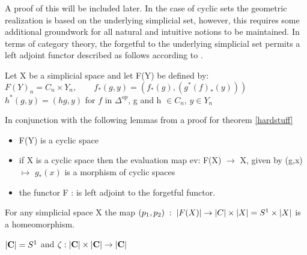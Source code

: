 \documentclass[../../main.tex]{subfiles}
\begin{document}
    A proof of this will be included later. In the case of cyclic sets the geometric realization is based on the underlying simplicial set, however, this requires some additional groundwork for all natural and intuitive notions to be maintained. In terms of category theory, the forgetful to the underlying simplicial set permits a left adjoint functor described as follows according to \cite{loday-cyclic}. 

    \begin{definition}
        Let X be a simplicial space and let F(Y) be defined by:
        $F(Y)_n=C_n\times Y_n, \qquad f_*(g,y)=(f_*(g), (g^*(f)_*(y)))$
        $h^*(g,y) = (hg,y) $ for $f$ in $\Delta^{op}$, g and h $\in C_n$, $y\in Y_n$
    \end{definition}

    In conjunction with the following lemmas from \cite{loday-cyclic} a proof for theorem \ref{hardstuff} 

    \begin{lemma}
        \begin{itemize}
            \item F(Y) is a cyclic space
            \item if X is a cyclic space then the evaluation map ev: F(X) $\to$ X, given by (g,x) $\mapsto$ $g_*(x)$ is a morphism of cyclic spaces
            \item the functor F : is left adjoint to the forgetful functor.
        \end{itemize}
    \end{lemma}

    \begin{lemma}
        For any simplicial space X the map $(p_1,p_2)\; : \;\geom[F(X)]\to \geom[C]\times \geom[X]= S^1\times \geom[X]$ is a homeomorphism. 
    \end{lemma}

    \begin{lemma}
        $\geom[\cat{C}]= S^1$ and $\zeta : \geom[\cat{C}]\times \geom[\cat{C}]\to \geom[\cat{C}]$
    \end{lemma}
\end{document}
